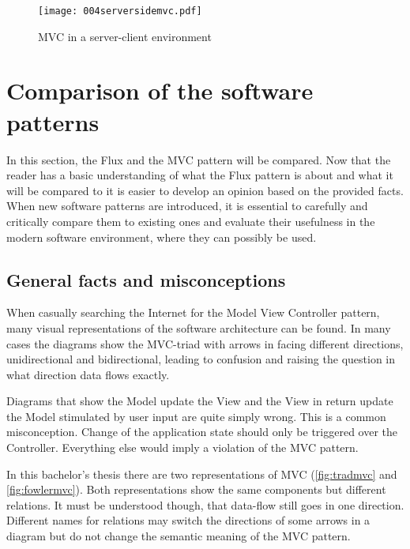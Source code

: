\begin{figure}
  \centering
  \texttt{[image: 004serversidemvc.pdf]}
  \caption{MVC in a server-client environment \cite[as in][]{ChristianAlfoni.2015}}
  \label{fig:serversidemvc}
\end{figure}

\section{Comparison of the software patterns}

In this section, the Flux and the MVC pattern will be compared. Now that the reader has a basic understanding of what the Flux pattern is about and what it will be compared to it is easier to develop an opinion based on the provided facts. When new software patterns are introduced, it is essential to carefully and critically compare them to existing ones and evaluate their usefulness in the modern software environment, where they can possibly be used.

\subsection{General facts and misconceptions}


When casually searching the Internet for the Model View Controller pattern, many visual representations of the software architecture can be found. In many cases the diagrams show the MVC-triad with arrows in facing different directions, unidirectional and bidirectional, leading to confusion and raising the question in what direction data flows exactly. 

Diagrams that show the Model update the View and the View in return update the Model stimulated by user input are quite simply wrong. This is a common misconception. Change of the application state should only be triggered over the Controller. Everything else would imply a violation of the MVC pattern.

In this bachelor's thesis there are two representations of MVC (\ref{fig:tradmvc} and \ref{fig:fowlermvc}). Both representations show the same components but different relations. It must be understood though, that data-flow still goes in one direction. Different names for relations may switch the directions of some arrows in a diagram but do not change the semantic meaning of the MVC pattern.

